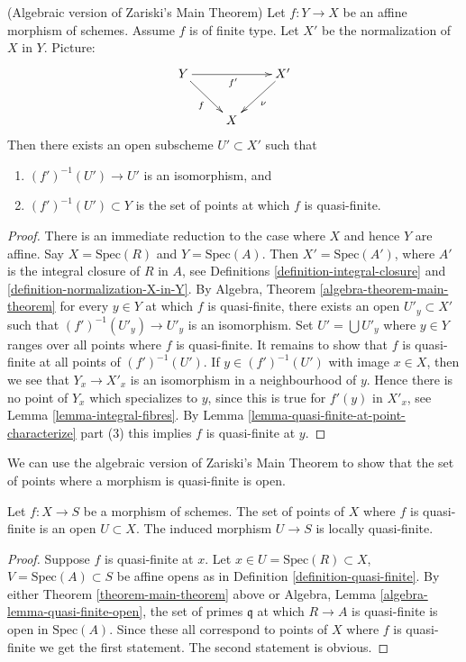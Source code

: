 \begin{theorem}
\label{theorem-main-theorem}
(Algebraic version of Zariski's Main Theorem)
Let $f : Y \to X$ be an affine morphism of schemes.
Assume $f$ is of finite type.
Let $X'$ be the normalization of $X$ in $Y$. Picture:
$$
\xymatrix{
Y \ar[rd]_f \ar[rr]_{f'} & & X' \ar[ld]^\nu \\
& X &
}
$$
Then there exists an open subscheme $U' \subset X'$ such that
\begin{enumerate}
\item $(f')^{-1}(U') \to U'$ is an isomorphism, and
\item $(f')^{-1}(U') \subset Y$ is the set of points at which
$f$ is quasi-finite.
\end{enumerate}
\end{theorem}

\begin{proof}
There is an immediate reduction to the case where $X$ and hence $Y$
are affine. Say $X = \text{Spec}(R)$ and $Y = \text{Spec}(A)$.
Then $X' = \text{Spec}(A')$, where $A'$ is the integral closure of
$R$ in $A$, see Definitions \ref{definition-integral-closure}
and \ref{definition-normalization-X-in-Y}. By
Algebra, Theorem \ref{algebra-theorem-main-theorem}
for every $y \in Y$ at which $f$ is quasi-finite, there exists an
open $U'_y \subset X'$ such that $(f')^{-1}(U'_y) \to U'_y$
is an isomorphism. Set $U' = \bigcup U'_y$ where $y \in Y$ ranges
over all points where $f$ is quasi-finite. It remains to show that
$f$ is quasi-finite at all points of $(f')^{-1}(U')$.
If $y \in (f')^{-1}(U')$ with image $x \in X$, then we see that
$Y_x \to X'_x$ is an isomorphism in a neighbourhood of $y$. Hence
there is no point of $Y_x$ which specializes to $y$, since this
is true for $f'(y)$ in $X'_x$, see Lemma \ref{lemma-integral-fibres}.
By Lemma \ref{lemma-quasi-finite-at-point-characterize} part (3)
this implies $f$ is quasi-finite at $y$.
\end{proof}

\noindent
We can use the algebraic version of Zariski's Main Theorem to show that
the set of points where a morphism is quasi-finite is open.

\begin{lemma}
\label{lemma-quasi-finite-points-open}
Let $f : X \to S$ be a morphism of schemes.
The set of points of $X$ where $f$ is quasi-finite is an open
$U \subset X$. The induced morphism $U \to S$ is locally quasi-finite.
\end{lemma}

\begin{proof}
Suppose $f$ is quasi-finite at $x$.
Let $x \in U = \text{Spec}(R) \subset X$, $V = \text{Spec}(A) \subset S$
be affine opens as in Definition \ref{definition-quasi-finite}.
By either Theorem \ref{theorem-main-theorem} above or
Algebra, Lemma \ref{algebra-lemma-quasi-finite-open},
the set of primes $\mathfrak q$ at which $R \to A$ is quasi-finite
is open in $\text{Spec}(A)$. Since these all correspond to points
of $X$ where $f$ is quasi-finite we get the first statement.
The second statement is obvious.
\end{proof}

